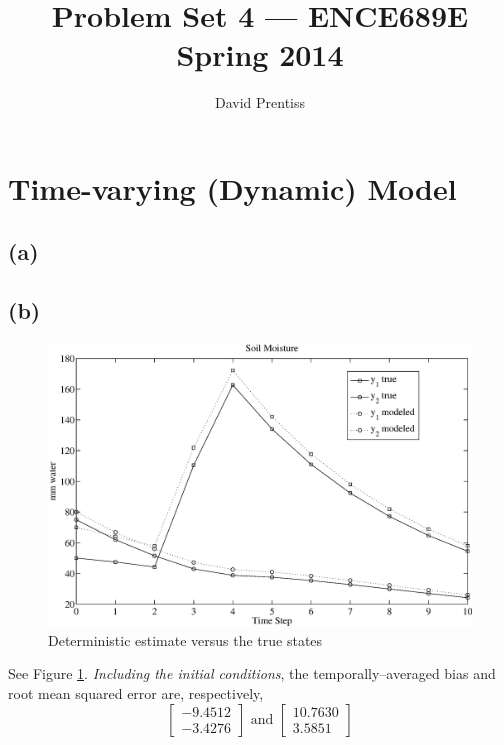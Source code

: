 \documentclass[fleqn, letterpaper]{tufte-handout}
\title{Problem Set 4 --- ENCE689E Spring 2014}
\author{David Prentiss}
\begin{document}
\maketitle

\section{Time-varying (Dynamic) Model}

\subsection{(a)}

{\scriptsize
        \begin{minipage}{\linewidth}
                
        \end{minipage}
}

\subsection{(b)}

\begin{figure}
        \includegraphics[width=\textwidth]{ps5figb}
        \caption{Deterministic estimate versus the true states}
        \label{ps5figb}
\end{figure}
See Figure \ref{ps5figb}. \emph{Including the initial conditions}, the temporally--averaged bias and root mean squared error are, respectively,
\[
        \begin{bmatrix}
                -9.4512 \\
                -3.4276
        \end{bmatrix}
        \text{ and }
        \begin{bmatrix}
                10.7630 \\
                3.5851
        \end{bmatrix}
\]
\end{document}
